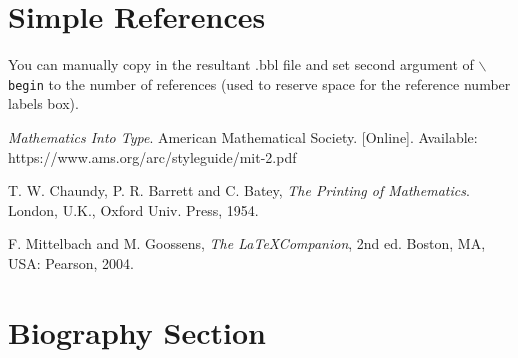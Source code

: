 \documentclass[lettersize,journal]{IEEEtran}
\begin{document}
\section{Simple References}
You can manually copy in the resultant .bbl file and set second argument of $\backslash${\tt{begin}} to the number of references
 (used to reserve space for the reference number labels box).

\begin{thebibliography}{1}


{\it{Mathematics Into Type}}. American Mathematical Society. [Online]. Available: https://www.ams.org/arc/styleguide/mit-2.pdf

T. W. Chaundy, P. R. Barrett and C. Batey, {\it{The Printing of Mathematics}}. London, U.K., Oxford Univ. Press, 1954.

F. Mittelbach and M. Goossens, {\it{The \LaTeX Companion}}, 2nd ed. Boston, MA, USA: Pearson, 2004.

\end{thebibliography}


\newpage

\section{Biography Section}

\vspace{11pt}


\vspace{11pt}

\vfill
\end{document}
